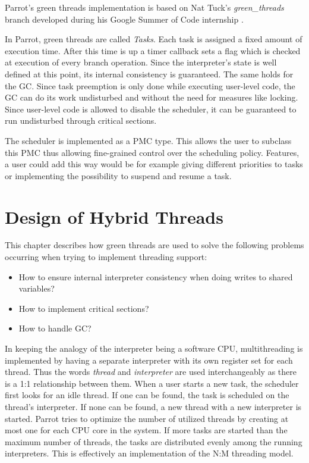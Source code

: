 \documentclass[bachelor,english]{hgbthesis}
\begin{document}
Parrot's green threads implementation is based on Nat Tuck's \textit{green\_threads} branch developed during his Google Summer of Code internship \cite{ChandonBlog}.

In Parrot, green threads are called \textit{Tasks}. Each task is assigned a fixed amount of execution time. After this time is up a timer callback sets a flag which is checked at execution of every branch operation. Since the interpreter's state is well defined at this point, its internal consistency is guaranteed. The same holds for the GC. Since task preemption is only done while executing user-level code, the GC can do its work undisturbed and without the need for measures like locking. Since user-level code is allowed to disable the scheduler, it can be guaranteed to run undisturbed through critical sections.

The scheduler is implemented as a PMC type. This allows the user to subclass this PMC thus allowing fine-grained control over the scheduling policy. Features, a user could add this way would be for example giving different priorities to tasks or implementing the possibility to suspend and resume a task.

\chapter{Design of Hybrid Threads}
\label{cha:design}

This chapter describes how green threads are used to solve the following problems occurring when trying to implement threading support:
%
\begin{itemize}
\item How to ensure internal interpreter consistency when doing writes to shared variables?
\item How to implement critical sections?
\item How to handle GC?
\end{itemize}

In keeping the analogy of the interpreter being a software CPU, multithreading is implemented by having a separate interpreter with its own register set for each thread. Thus the words \textit{thread} and \textit{interpreter} are used interchangeably as there is a 1:1 relationship between them. When a user starts a new task, the scheduler first looks for an idle thread. If one can be found, the task is scheduled on the thread's interpreter. If none can be found, a new thread with a new interpreter is started. Parrot tries to optimize the number of utilized threads by creating at most one for each CPU core in the system. If more tasks are started than the maximum number of threads, the tasks are distributed evenly among the running interpreters. This is effectively an implementation of the N:M threading model.
\end{document}

